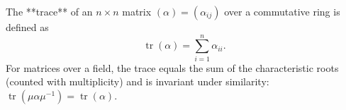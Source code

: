 The **trace** of an $n \times n$ matrix $(\alpha) = (\alpha_{ij})$ over a commutative ring is defined as
$$\operatorname{tr}(\alpha) = \sum_{i=1}^{n} \alpha_{ii}.$$
For matrices over a field, the trace equals the sum of the characteristic roots (counted with multiplicity) and is invariant under similarity: $\operatorname{tr}(\mu \alpha \mu^{-1}) = \operatorname{tr}(\alpha)$.
